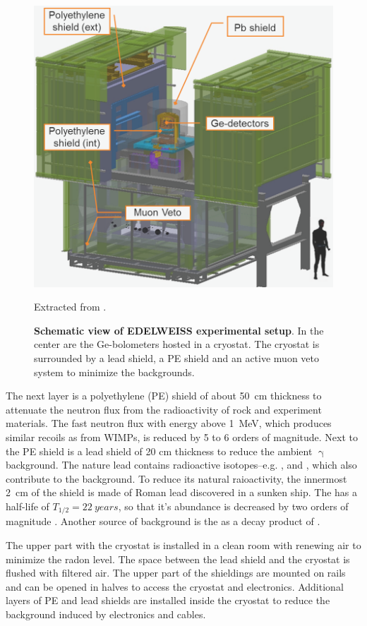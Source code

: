   \begin{figure}[ht]
    \centering
    \includegraphics[width=0.75\textwidth{}]{./fig/exp_setup.png}
    \caption{\textbf{Schematic view of EDELWEISS experimental setup}.
    In the center are the Ge-bolometers hosted in a cryostat. The cryostat is surrounded by a lead shield, a PE shield and an active muon veto system to minimize the backgrounds.} Extracted from \cite{Kef16}.
    \label{fig:exp-setup}
  \end{figure}


  The next layer is a polyethylene (PE) shield of about \SI{50}{cm} thickness to attenuate the neutron flux from the radioactivity of rock and experiment materials. The fast neutron flux with energy above \SI{1}{MeV}, which produces similar recoils as from WIMPs, is reduced by 5 to 6 orders of magnitude. %
  Next to the PE shield is a lead shield of 20 cm thickness to reduce the ambient $\upgamma$ background. The nature lead contains radioactive isotopes--e.g. ,  and , which also contribute to the background. To reduce its natural raioactivity, the innermost \SI{2}{cm} of the shield is made of Roman lead discovered in a sunken ship. The  has a half-life of $T_{1/2}=\SI{22}{years}$, so that it's abundance is decreased by two orders of magnitude \cite{Sch13a}.
  Another source of background is the  as a decay product of .

  The upper part with the cryostat is installed in a clean room with renewing air to minimize the radon level. The space between the lead shield and the cryostat is flushed with filtered air.
  The upper part of the shieldings are mounted on rails and can be opened in halves to access the cryostat and electronics. Additional layers of PE and lead shields are installed inside the cryostat to reduce the background induced by electronics and cables.

